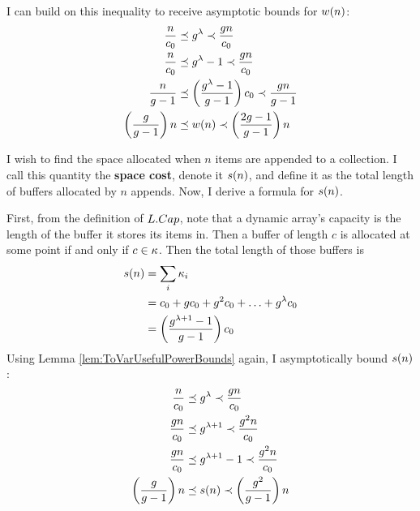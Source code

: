 I can build on this inequality to receive asymptotic bounds for $w(n)$:
\begin{align*}
\frac n {c_0} &\preceq g^\lambda \prec \frac {g{n}} {c_0}\\
\frac n {c_0} &\preceq g^\lambda - 1 \prec \frac {g{n}} {c_0}\\
\frac n {g - 1} &\preceq \left( \frac{g^\lambda - 1}{g - 1} \right) c_0 \prec \frac {g{n}} {g - 1}\\
\left( \frac{g}{g - 1} \right) n &\preceq w(n) \prec \left( \frac{2g - 1}{g - 1} \right) n
\end{align*}
\HdrSpaceComplex

I wish to find the space allocated when $n$ items are appended to a collection. I call this quantity the \textbf{space cost}, denote it $s(n)$, and define it as the total length of buffers allocated by $n$ appends. Now, I derive a formula for $s(n)$.

First, from the definition of $L.Cap$, note that a dynamic array's capacity is the length of the buffer it stores its items in. Then a buffer of length $c$ is allocated at some point if and only if $c \in \kappa$. Then the total length of those buffers is
\begin{align*}
s(n) &= \sum_i {\kappa_i}\\
&= c_0 + gc_0 + g^2c_0 + \ldots + g^\lambda c_0\\
&= \left( \frac{g^{\lambda + 1} - 1}{g - 1} \right) c_0
\end{align*}
Using Lemma \ref{lem:ToVarUsefulPowerBounds} again, I asymptotically bound $s(n)$:
\begin{align*}
\frac n {c_0} &\preceq g^\lambda \prec \frac {g{n}} {c_0}\\
\frac {g n} {c_0} &\preceq g^{\lambda + 1} \prec \frac {g^2 n} {c_0}\\
\frac {g n} {c_0} &\preceq g^{\lambda + 1} - 1 \prec \frac {g^2 n} {c_0}\\
\left( \frac{g}{g - 1} \right) n &\preceq s(n) \prec \left( \frac{g^2}{g - 1} \right) n
\end{align*}